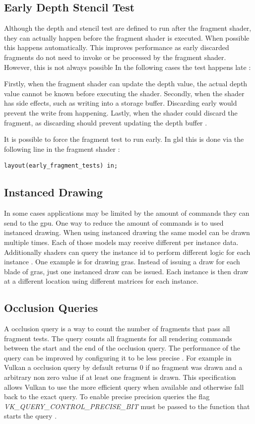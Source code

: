 \subsection{Early Depth Stencil Test}
Although the depth and stencil test are defined to run after the fragment shader, they can actually happen before the fragment shader is executed. When possible this happens automatically. This improves performance as early discarded fragments do not need to invoke or be processed by the fragment shader. However, this is not always possible In the following cases the test happens late \cite{sellers:vulkanprogramming}:

Firstly, when the fragment shader can update the depth value, the actual depth value cannot be known before executing the shader. Secondly, when the shader has side effects, such as writing into a storage buffer. Discarding early would prevent the write from happening. Lastly, when the shader could discard the fragment, as discarding should prevent updating the depth buffer \cite{sellers:vulkanprogramming}.

 It is possible to force the fragment test to run early. In \gls{glsl} this is done via the following line in the fragment shader \cite{khronos:glsl4.60:spec}:
\begin{lstlisting}
layout(early_fragment_tests) in;
\end{lstlisting}


\subsection{Instanced Drawing}
In some cases applications may be limited by the amount of commands they can send to the \gls{gpu}. One way to reduce the amount of commands is to used instanced drawing. When using instanced drawing the same model can be drawn multiple times. Each of those models may receive different per instance data. Additionally shaders can query the instance id to perform different logic for each instance \cite{akine:2018:realtime}. One example is for drawing gras. Instead of issuing a draw for each blade of gras, just one instanced draw can be issued. Each instance is then draw at a different location using different matrices for each instance.


\subsection{Occlusion Queries}
A occlusion query is a way to count the number of fragments that pass all fragment tests. The query counts all fragments for all rendering commands between the start and the end of the occlusion query. The performance of the query can be improved by configuring it to be less precise \cite{akine:2018:realtime}. For example in Vulkan a occlusion query by default returns 0 if no fragment was drawn and a arbitrary non zero value if at least one fragment is drawn. This specification allows Vulkan to use the more efficient query when available and otherwise fall back to the exact query. To enable precise precision queries the flag \textit{VK\_QUERY\_CONTROL\_PRECISE\_BIT} must be passed to the function that starts the query \cite{khronos:vulkan:spec1.1}.

